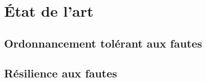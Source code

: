 \section{\'Etat de l'art}
\label{sec:contribution_tf_ordo_edla}

\subsection{Ordonnancement tolérant aux fautes}
\subsection{Résilience aux fautes}


